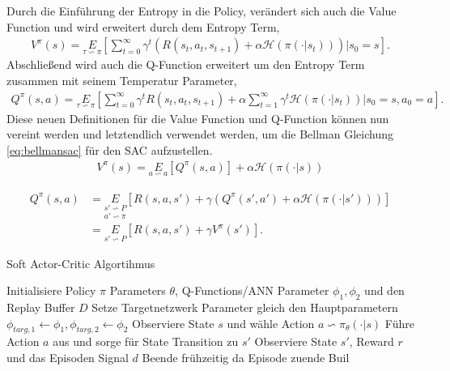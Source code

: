 \documentclass[]{iat}
\begin{document}
Durch die Einführung der Entropy in die Policy, verändert sich auch die Value Function und wird erweitert durch dem Entropy Term,
\begin{align}
    V^{\pi}(s) = \underset{\tau \backsim \pi}{E}\left[\sum_{t = 0}^{\infty} \gamma^t\left(R(s_t, a_t, s_{t+1}) + \alpha \mathcal{H}(\pi(\cdot | s_t))\right) \vert  s_0 = s \right].
\end{align}
Abschließend wird auch die Q-Function erweitert um den Entropy Term zusammen mit seinem Temperatur Parameter,
\begin{align}
    Q^{\pi}(s, a) = \underset{\tau \backsim \pi}{E}\left[\sum_{t = 0}^{\infty} \gamma^t R(s_t, a_t, s_{t+1}) + \alpha \sum_{t = 1}^{\infty} \gamma^t \mathcal{H}(\pi(\cdot | s_t)) \vert s_0 = s, a_0 = a \right].
\end{align}
Diese neuen Definitionen für die Value Function und Q-Function können nun vereint werden und letztendlich verwendet werden, um die Bellman Gleichung \ref{eq:bellmansac} für den SAC aufzustellen. \cite[]{sac} \cite[]{brockman2016openai}
\begin{align}
    V^{\pi}(s) = \underset{a \backsim a}{E} \left[Q^{\pi}(s, a)\right] + \alpha \mathcal{H}(\pi(\cdot | s))
\end{align}

\begin{align}
    Q^{\pi}(s,a) & = \underset{a' \backsim \pi}{\underset{s' \backsim P}{E}} \left[R(s, a, s') + \gamma (Q^{\pi}(s', a') + \alpha \mathcal{H}(\pi(\cdot | s')))\right] \\
                 & = \underset{s' \backsim P}{E} \left[R(s,a,s') + \gamma V^{\pi}(s')\right]. \label{eq:bellmansac}
\end{align}


\begin{algorithm}
    \caption{Soft Actor-Critic Algortihmus}\label{pse:sac_pseudo}
    \begin{algorithmic}[1]
        \State Initialisiere Policy $\pi$ Parameters $\theta$, Q-Functions/ANN Parameter $\phi_1, \phi_2$ und den Replay Buffer $D$
        \State Setze Targetnetzwerk Parameter gleich den Hauptparametern $\phi_{targ,1} \leftarrow \phi_1, \phi_{targ,2} \leftarrow \phi_2$
        \State Observiere State $s$ und wähle Action $a \backsim \pi_{\theta}(\cdot | s)$
        \State Führe Action $a$ aus und sorge für State Transition zu $s'$
        \State Observiere State $s'$, Reward $r$ und das Episoden Signal $d$
        \State Beende frühzeitig da Episode zuende
        \EndIf
        \State Buil
        \EndFor
    \end{algorithmic}
\end{algorithm}
\end{document}

